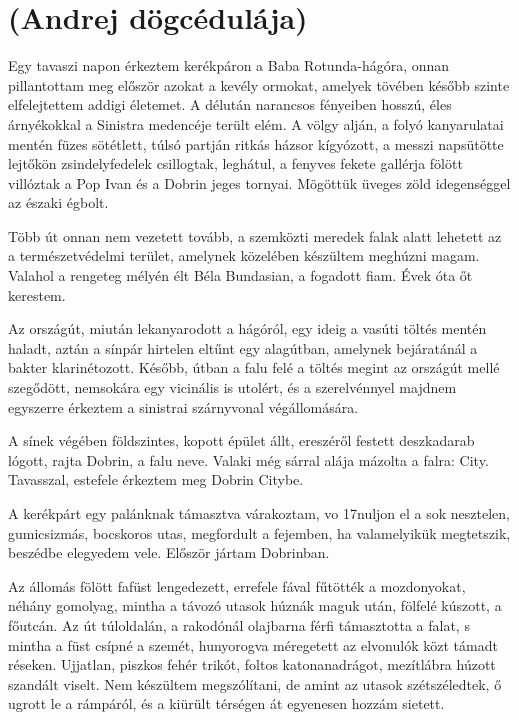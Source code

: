 \documentclass{IEEEtran}
\begin{document}
\section{(Andrej dögcédulája)}

Egy tavaszi napon érkeztem kerékpáron a Baba Rotunda-hágóra, onnan
pillantottam meg először azokat a kevély ormokat, amelyek tövében később
szinte elfelejtettem addigi életemet. A délután narancsos fényeiben hosszú,
éles árnyékokkal a Sinistra medencéje terült elém. A völgy alján, a folyó
kanyarulatai mentén füzes sötétlett, túlsó partján ritkás házsor kígyózott, a
messzi napsütötte lejtőkön zsindelyfedelek csillogtak, leghátul, a fenyves
fekete gallérja fölött villóztak a Pop Ivan és a Dobrin jeges tornyai.
Mögöttük üveges zöld idegenséggel az északi égbolt.

Több út onnan nem vezetett tovább, a szemközti meredek falak alatt lehetett az
a természetvédelmi terület, amelynek közelében készültem meghúzni magam.
Valahol a rengeteg mélyén élt Béla Bundasian, a fogadott fiam. Évek óta őt
kerestem.

Az országút, miután lekanyarodott a hágóról, egy ideig a vasúti töltés mentén
haladt, aztán a sínpár hirtelen eltűnt egy alagútban, amelynek bejáratánál a
bakter klarinétozott. Később, útban a falu felé a töltés megint az országút
mellé szegődött, nemsokára egy vicinális is utolért, és a szerelvénnyel
majdnem egyszerre érkeztem a sinistrai szárnyvonal végállomására.

A sínek végében földszintes, kopott épület állt, ereszéről festett deszkadarab
lógott, rajta Dobrin, a falu neve. Valaki még sárral alája mázolta a falra:
City. Tavasszal, estefele érkeztem meg Dobrin Citybe.

A kerékpárt egy palánknak támasztva várakoztam, vo 17nuljon el a sok
nesztelen, gumicsizmás, bocskoros utas, megfordult a fejemben, ha valamelyikük
megtetszik, beszédbe elegyedem vele. Először jártam Dobrinban.

Az állomás fölött fafüst lengedezett, errefele fával fűtötték a mozdonyokat,
néhány gomolyag, mintha a távozó utasok húznák maguk után, fölfelé kúszott, a
főutcán. Az út túloldalán, a rakodónál olajbarna férfi támasztotta a falat, s
mintha a füst csípné a szemét, hunyorogva méregetett az elvonulók közt támadt
réseken. Ujjatlan, piszkos fehér trikót, foltos katonanadrágot, mezítlábra
húzott szandált viselt. Nem készültem megszólítani, de amint az utasok
szétszéledtek, ő ugrott le a rámpáról, és a kiürült térségen át egyenesen
hozzám sietett.
\end{document}
